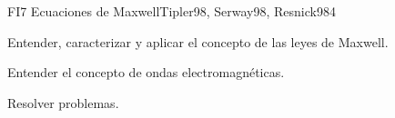 \begin{syllabus}
\begin{unit}{FI7 Ecuaciones de Maxwell}{Tipler98, Serway98, Resnick98}{4}
   \begin{unitgoals}
         \item  Entender, caracterizar y aplicar el concepto de las leyes de Maxwell.
         \item  Entender el concepto de ondas electromagnéticas.
         \item  Resolver problemas.
   \end{unitgoals}
\end{unit}

\begin{coursebibliography}
\end{coursebibliography}

\end{syllabus}
